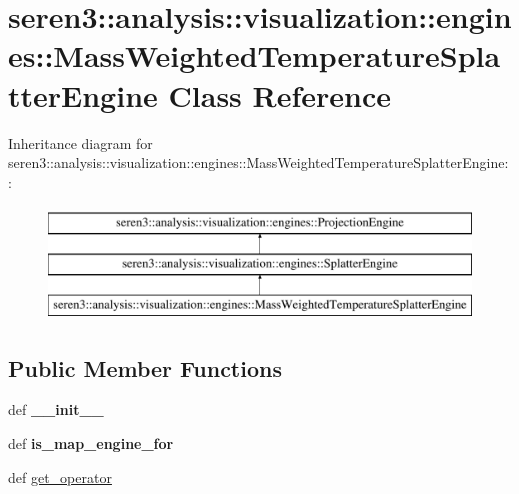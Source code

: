\hypertarget{classseren3_1_1analysis_1_1visualization_1_1engines_1_1MassWeightedTemperatureSplatterEngine}{
\section{seren3::analysis::visualization::engines::MassWeightedTemperatureSplatterEngine Class Reference}
\label{classseren3_1_1analysis_1_1visualization_1_1engines_1_1MassWeightedTemperatureSplatterEngine}
}
Inheritance diagram for seren3::analysis::visualization::engines::MassWeightedTemperatureSplatterEngine::\begin{figure}[H]
\begin{center}
\leavevmode
\includegraphics[height=3cm]{classseren3_1_1analysis_1_1visualization_1_1engines_1_1MassWeightedTemperatureSplatterEngine}
\end{center}
\end{figure}
\subsection*{Public Member Functions}
\begin{DoxyCompactItemize}
\item 
\hypertarget{classseren3_1_1analysis_1_1visualization_1_1engines_1_1MassWeightedTemperatureSplatterEngine_ae6f3728565348432fd3f2e846c38ab8e}{
def {\bfseries \_\-\_\-init\_\-\_\-}}
\label{classseren3_1_1analysis_1_1visualization_1_1engines_1_1MassWeightedTemperatureSplatterEngine_ae6f3728565348432fd3f2e846c38ab8e}

\item 
\hypertarget{classseren3_1_1analysis_1_1visualization_1_1engines_1_1MassWeightedTemperatureSplatterEngine_a289a8405e8a43a1a48a6550378e17102}{
def {\bfseries is\_\-map\_\-engine\_\-for}}
\label{classseren3_1_1analysis_1_1visualization_1_1engines_1_1MassWeightedTemperatureSplatterEngine_a289a8405e8a43a1a48a6550378e17102}

\item 
def \hyperlink{classseren3_1_1analysis_1_1visualization_1_1engines_1_1MassWeightedTemperatureSplatterEngine_ab0bf32328b5d4a70303e76f866613e46}{get\_\-operator}
\end{DoxyCompactItemize}


